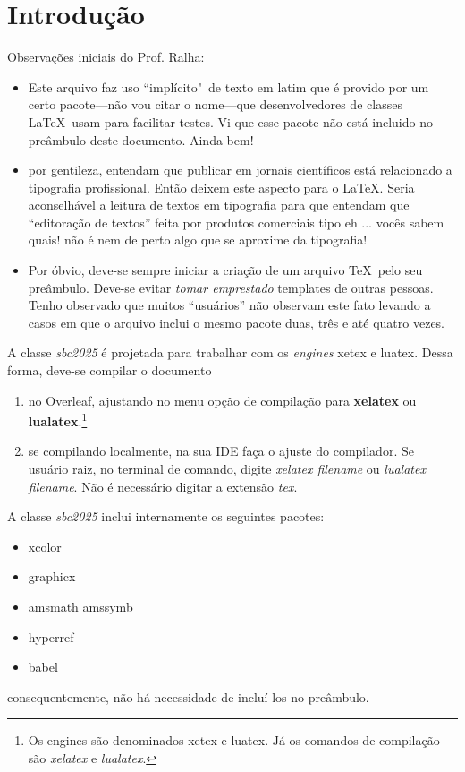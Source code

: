 \documentclass[portuguese]{sbc2025}%
\begin{document}
\section{Introdução}
\label{sec:intro}

Observações iniciais do Prof. Ralha:
\begin{itemize}
    \item Este arquivo faz uso ``implícito"\ de texto em latim que é provido por um certo pacote---não vou citar o nome---que desenvolvedores de classes \LaTeX\ usam para facilitar testes. Vi que esse pacote não está incluido no preâmbulo deste documento. Ainda bem!
    \item por gentileza, entendam que publicar em jornais científicos está relacionado a tipografia profissional. Então deixem este aspecto para o \LaTeX. Seria aconselhável a leitura de textos em tipografia para que entendam que ``editoração de textos'' feita por produtos comerciais tipo eh ... vocês sabem quais! não é nem de perto algo que se aproxime da tipografia!
    \item Por óbvio, deve-se sempre iniciar a criação de um arquivo \TeX\ pelo seu preâmbulo. Deve-se evitar \textit{tomar emprestado} templates de outras pessoas. Tenho observado que muitos ``usuários'' não observam este fato levando a casos em que o arquivo inclui o mesmo pacote duas, três e até quatro vezes.
\end{itemize}

A classe \textsl{sbc2025} é projetada para trabalhar com os \textit{engines} xetex e luatex. Dessa forma, deve-se compilar o documento 
\begin{enumerate}
    \item no Overleaf, ajustando no menu opção de compilação para \textbf{xelatex} ou \textbf{lualatex}.\footnote{Os engines são denominados xetex e luatex. Já os comandos de compilação são \textsl{xelatex} e \textsl{lualatex}.}
    \item se compilando localmente, na sua IDE faça o ajuste do compilador. Se usuário raiz, no terminal de comando, digite \textsl{xelatex filename} ou \textsl{lualatex filename}. Não é necessário digitar a extensão \textsl{tex}.
\end{enumerate}

A classe \textsl{sbc2025} inclui internamente os seguintes pacotes:
\begin{itemize}
    \item xcolor
    \item graphicx
    \item amsmath amssymb
    \item hyperref
    \item babel
\end{itemize}
\noindent consequentemente, não há necessidade de incluí-los no preâmbulo.
\end{document}

